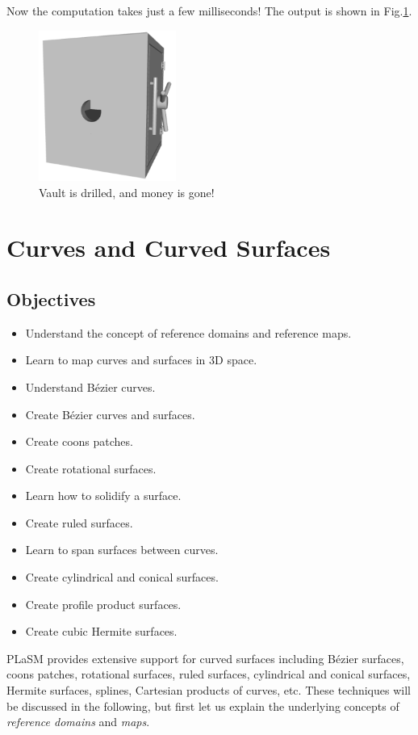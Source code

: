 \noindent
Now the computation takes just a few milliseconds!
The output is shown in Fig.\ref{fig:vault2}.

\begin{figure}[!ht]
\begin{center}
\includegraphics[width=0.4\textwidth]{img/vault2.png}
\end{center}
\vspace{-4mm}
\caption{Vault is drilled, and money is gone!}
\label{fig:vault2}
\end{figure}
\noindent




\section{Curves and Curved Surfaces}\label{sec:curves}

\subsection{Objectives}
\begin{itemize}
\item Understand the concept of reference domains and reference maps.
\item Learn to map curves and surfaces in 3D space.
\item Understand B\'ezier curves.
\item Create B\'ezier curves and surfaces.
\item Create coons patches.
\item Create rotational surfaces.
\item Learn how to solidify a surface.
\item Create ruled surfaces.
\item Learn to span surfaces between curves.
\item Create cylindrical and conical surfaces.
\item Create profile product surfaces.
\item Create cubic Hermite surfaces.
\end{itemize}
PLaSM provides extensive support for curved surfaces including 
B\'ezier surfaces, coons patches, rotational surfaces, ruled surfaces,  
cylindrical and conical surfaces, Hermite surfaces, 
splines, Cartesian products of curves, etc. These techniques will be 
discussed in the following, but first let us explain the underlying 
concepts of {\em reference domains} and {\em maps}.


